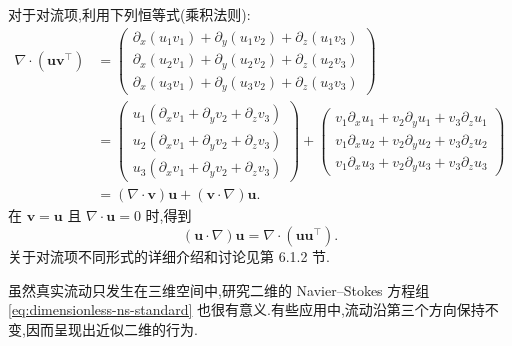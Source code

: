\begin{note}
对于对流项,利用下列恒等式(乘积法则):
{\small
\begin{equation}\label{eq:convective-product-rule}
\begin{aligned}
  \nabla\cdot(\bm{u}\bm{v}^{\top})
  & =\begin{pmatrix}
      \partial_x(u_1v_1)+\partial_y(u_1v_2)+\partial_z(u_1v_3)\\
      \partial_x(u_2v_1)+\partial_y(u_2v_2)+\partial_z(u_2v_3)\\
      \partial_x(u_3v_1)+\partial_y(u_3v_2)+\partial_z(u_3v_3)
     \end{pmatrix}\\
  & =\begin{pmatrix}
      u_1(\partial_xv_1+\partial_yv_2+\partial_zv_3)\\
      u_2(\partial_xv_1+\partial_yv_2+\partial_zv_3)\\
      u_3(\partial_xv_1+\partial_yv_2+\partial_zv_3)
     \end{pmatrix}
     +\begin{pmatrix}
       v_1\partial_xu_1+v_2\partial_yu_1+v_3\partial_zu_1\\
       v_1\partial_xu_2+v_2\partial_yu_2+v_3\partial_zu_2\\
       v_1\partial_xu_3+v_2\partial_yu_3+v_3\partial_zu_3
      \end{pmatrix}\\
  &=(\nabla\cdot\bm{v})\bm{u}
    +(\bm{v}\cdot\nabla)\bm{u}.
\end{aligned}
\end{equation}
}
在 $\bm{v}=\bm{u}$ 且 $\nabla\cdot\bm{u}=0$ 时,得到
\begin{equation}\label{eq:convective-divergence-form}
  (\bm{u}\cdot\nabla)\bm{u}
  =\nabla\cdot(\bm{u}\bm{u}^{\top}).
\end{equation}
关于对流项不同形式的详细介绍和讨论见第 6.1.2 节.
\end{note}

\begin{note}\label{note:two-dimensional-ns}
虽然真实流动只发生在三维空间中,研究二维的 Navier--Stokes 方程组\cref{eq:dimensionless-ns-standard} 也很有意义.有些应用中,流动沿第三个方向保持不变,因而呈现出近似二维的行为.
\end{note}

